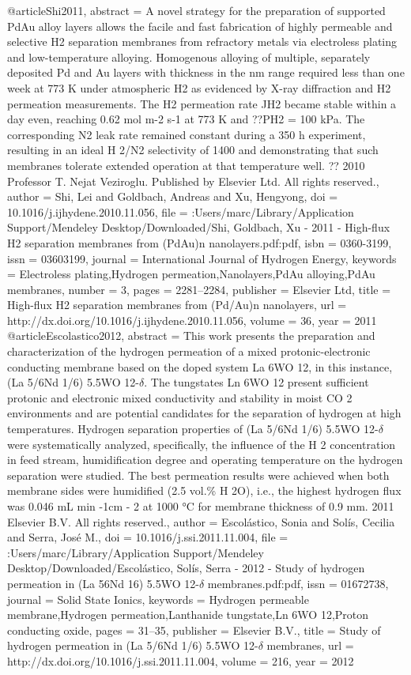@article{Shi2011,
abstract = {A novel strategy for the preparation of supported PdAu alloy layers allows the facile and fast fabrication of highly permeable and selective H2 separation membranes from refractory metals via electroless plating and low-temperature alloying. Homogenous alloying of multiple, separately deposited Pd and Au layers with thickness in the nm range required less than one week at 773 K under atmospheric H2 as evidenced by X-ray diffraction and H2 permeation measurements. The H2 permeation rate JH2 became stable within a day even, reaching 0.62 mol m-2 s-1 at 773 K and ??PH2 = 100 kPa. The corresponding N2 leak rate remained constant during a 350 h experiment, resulting in an ideal H 2/N2 selectivity of 1400 and demonstrating that such membranes tolerate extended operation at that temperature well. ?? 2010 Professor T. Nejat Veziroglu. Published by Elsevier Ltd. All rights reserved.},
author = {Shi, Lei and Goldbach, Andreas and Xu, Hengyong},
doi = {10.1016/j.ijhydene.2010.11.056},
file = {:Users/marc/Library/Application Support/Mendeley Desktop/Downloaded/Shi, Goldbach, Xu - 2011 - High-flux H2 separation membranes from (PdAu)n nanolayers.pdf:pdf},
isbn = {0360-3199},
issn = {03603199},
journal = {International Journal of Hydrogen Energy},
keywords = {Electroless plating,Hydrogen permeation,Nanolayers,PdAu alloying,PdAu membranes},
number = {3},
pages = {2281--2284},
publisher = {Elsevier Ltd},
title = {{High-flux H2 separation membranes from (Pd/Au)n nanolayers}},
url = {http://dx.doi.org/10.1016/j.ijhydene.2010.11.056},
volume = {36},
year = {2011}
}
@article{Escolastico2012,
abstract = {This work presents the preparation and characterization of the hydrogen permeation of a mixed protonic-electronic conducting membrane based on the doped system La 6WO 12, in this instance, (La 5/6Nd 1/6) 5.5WO 12-$\delta$. The tungstates Ln 6WO 12 present sufficient protonic and electronic mixed conductivity and stability in moist CO 2 environments and are potential candidates for the separation of hydrogen at high temperatures. Hydrogen separation properties of (La 5/6Nd 1/6) 5.5WO 12-$\delta$ were systematically analyzed, specifically, the influence of the H 2 concentration in feed stream, humidification degree and operating temperature on the hydrogen separation were studied. The best permeation results were achieved when both membrane sides were humidified (2.5 vol.{\%} H 2O), i.e., the highest hydrogen flux was 0.046 mL min -1cm - 2 at 1000 °C for membrane thickness of 0.9 mm. {\textcopyright} 2011 Elsevier B.V. All rights reserved.},
author = {Escol{\'{a}}stico, Sonia and Sol{\'{i}}s, Cecilia and Serra, Jos{\'{e}} M.},
doi = {10.1016/j.ssi.2011.11.004},
file = {:Users/marc/Library/Application Support/Mendeley Desktop/Downloaded/Escol{\'{a}}stico, Sol{\'{i}}s, Serra - 2012 - Study of hydrogen permeation in (La 56Nd 16) 5.5WO 12-$\delta$ membranes.pdf:pdf},
issn = {01672738},
journal = {Solid State Ionics},
keywords = {Hydrogen permeable membrane,Hydrogen permeation,Lanthanide tungstate,Ln 6WO 12,Proton conducting oxide},
pages = {31--35},
publisher = {Elsevier B.V.},
title = {{Study of hydrogen permeation in (La 5/6Nd 1/6) 5.5WO 12-$\delta$ membranes}},
url = {http://dx.doi.org/10.1016/j.ssi.2011.11.004},
volume = {216},
year = {2012}
}
